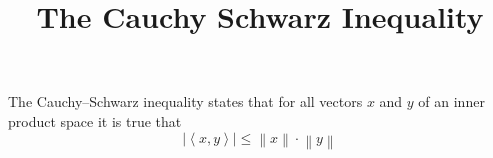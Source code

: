 \documentclass{amsart}
\begin{document}
 
 \title{The Cauchy Schwarz Inequality}
 
 \maketitle
 
The Cauchy–Schwarz inequality states that for all vectors $x$ and $y$ of an inner product space it is true that
$$\left | \left \langle x, y \right \rangle \right | \leq \left \| x \right \| \cdot \left \| y \right \|$$
 
\end{document}
